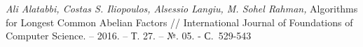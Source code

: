 \begin{thebibliography}{99}

{\it Ali Alatabbi, Costas S. Iliopoulos, Alsessio Langiu, M. Sohel Rahman,}
Algorithms for Longest Common Abelian Factors /\!/
International Journal of Foundations of Computer Science. – 2016. – Т. 27. – №. 05. - С.~529-543



\end{thebibliography}



